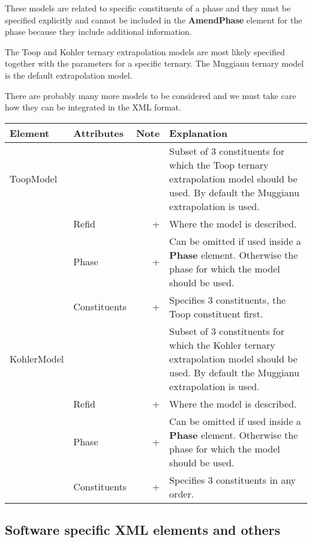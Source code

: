 \documentclass{article}
\begin{document}
These models are related to specific constituents of a phase and they
must be specified explicitly and cannot be included in the {\bf
  AmendPhase} element for the phase because they include additional
information.

The Toop and Kohler ternary extrapolation models are most likely
specified together with the parameters for a specific ternary.  The
Muggianu ternary model is the default extrapolation model.

There are probably many more models to be considered and we must take
care how they can be integrated in the XML format.

\bigskip
\begin{tabular}{|p{} p{} r p{}|}\hline
  Element & Attributes & Note & Explanation\\\hline

  ToopModel & & & Subset of 3 constituents for which the Toop ternary extrapolation model should be used.    By default the Muggianu extrapolation is used.\\
      & Refid & + & Where the model is described.\\
      & Phase & + & Can be omitted if used inside a {\bf Phase} element.  Otherwise the phase for which the model should be used.\\
      & Constituents & + & Specifies 3 constituents, the Toop constituent first.\\\hline

  KohlerModel & &  & Subset of 3 constituents for which the Kohler ternary extrapolation model should be used.  By default the Muggianu extrapolation is used.\\
      & Refid & + & Where the model is described.\\
      & Phase & + & Can be omitted if used inside a {\bf Phase} element.  Otherwise the phase for which the model should be used.\\
      & Constituents & + & Specifies 3 constituents in any order.\\\hline

\end{tabular}


\newpage 

\subsection{Software specific XML elements and others}
\end{document}
